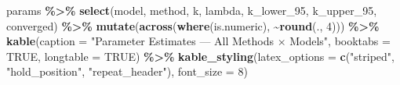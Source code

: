 \documentclass[
]{article}
\newenvironment{Shaded}{\begin{snugshade}}{\end{snugshade}}
\newcommand{\AttributeTok}[1]{\textcolor[rgb]{0.13,0.29,0.53}{#1}}
\newcommand{\ConstantTok}[1]{\textcolor[rgb]{0.56,0.35,0.01}{#1}}
\newcommand{\DecValTok}[1]{\textcolor[rgb]{0.00,0.00,0.81}{#1}}
\newcommand{\FunctionTok}[1]{\textcolor[rgb]{0.13,0.29,0.53}{\textbf{#1}}}
\newcommand{\NormalTok}[1]{#1}
\newcommand{\SpecialCharTok}[1]{\textcolor[rgb]{0.81,0.36,0.00}{\textbf{#1}}}
\newcommand{\StringTok}[1]{\textcolor[rgb]{0.31,0.60,0.02}{#1}}
\begin{document}
\begin{Shaded}
\begin{Highlighting}[]
\NormalTok{params }\SpecialCharTok{\%\textgreater{}\%}
  \FunctionTok{select}\NormalTok{(model, method, k, lambda, k\_lower\_95, k\_upper\_95, converged) }\SpecialCharTok{\%\textgreater{}\%}
  \FunctionTok{mutate}\NormalTok{(}\FunctionTok{across}\NormalTok{(}\FunctionTok{where}\NormalTok{(is.numeric), }\SpecialCharTok{\textasciitilde{}}\FunctionTok{round}\NormalTok{(., }\DecValTok{4}\NormalTok{))) }\SpecialCharTok{\%\textgreater{}\%}
  \FunctionTok{kable}\NormalTok{(}\AttributeTok{caption =} \StringTok{"Parameter Estimates — All Methods × Models"}\NormalTok{,}
        \AttributeTok{booktabs =} \ConstantTok{TRUE}\NormalTok{, }\AttributeTok{longtable =} \ConstantTok{TRUE}\NormalTok{) }\SpecialCharTok{\%\textgreater{}\%}
  \FunctionTok{kable\_styling}\NormalTok{(}\AttributeTok{latex\_options =} \FunctionTok{c}\NormalTok{(}\StringTok{"striped"}\NormalTok{, }\StringTok{"hold\_position"}\NormalTok{, }\StringTok{"repeat\_header"}\NormalTok{),}
                \AttributeTok{font\_size =} \DecValTok{8}\NormalTok{)}
\end{Highlighting}
\end{Shaded}

\begingroup\fontsize{8}{10}\selectfont
\end{document}
